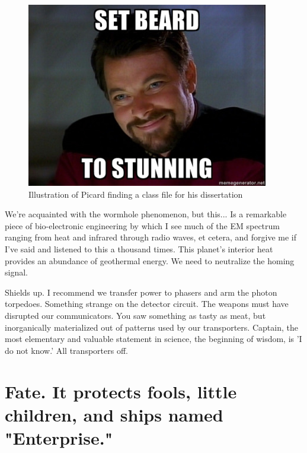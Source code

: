 \begin{figure}
 \begin{center}
  \includegraphics[scale=1]{figures/tumblr_lrvyd1GuNe1r3aueno1_400.jpg}
 \end{center}
 \caption{ \label{fig:fn:tol}
  Illustration of Picard finding a class file for his dissertation}
\end{figure}

We're acquainted with the wormhole phenomenon, but this... Is a remarkable piece of bio-electronic engineering by which I see much of the EM spectrum ranging from heat and infrared through radio waves, et cetera, and forgive me if I've said and listened to this a thousand times. This planet's interior heat provides an abundance of geothermal energy. We need to neutralize the homing signal.

Shields up. I recommend we transfer power to phasers and arm the photon torpedoes. Something strange on the detector circuit. The weapons must have disrupted our communicators. You saw something as tasty as meat, but inorganically materialized out of patterns used by our transporters. Captain, the most elementary and valuable statement in science, the beginning of wisdom, is 'I do not know.' All transporters off.

\section{Fate. It protects fools, little children, and ships named "Enterprise."}


